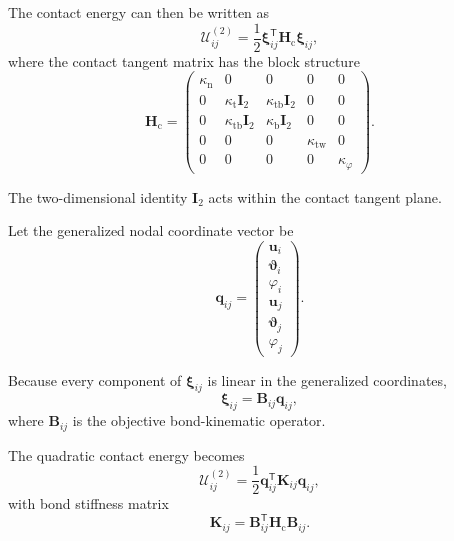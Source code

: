 The contact energy can then be written as
\begin{equation}
    \boxed{ \mathcal{U}_{ij}^{(2)} = \frac{1}{2} \boldsymbol{\xi}_{ij}^{\mathsf{T}} \mathbf{H}_{\mathrm{c}} \boldsymbol{\xi}_{ij} },
\end{equation}
where the contact tangent matrix has the block structure
\begin{equation}
    \boxed{ \mathbf{H}_{\mathrm{c}} =
    \begin{pmatrix}
        \kappa_{\mathrm{n}} & 0 & 0 & 0 & 0 \\
        0 & \kappa_{\mathrm{t}}\mathbf{I}_2 & \kappa_{\mathrm{tb}}\mathbf{I}_2 & 0 & 0 \\
        0 & \kappa_{\mathrm{tb}}\mathbf{I}_2 & \kappa_{\mathrm{b}}\mathbf{I}_2 & 0 & 0 \\
        0 & 0 & 0 & \kappa_{\mathrm{tw}} & 0 \\
        0 & 0 & 0 & 0 & \kappa_{\varphi}
    \end{pmatrix} }.
\end{equation}

The two-dimensional identity $\mathbf{I}_2$ acts within the contact tangent plane.

Let the generalized nodal coordinate vector be
\begin{equation}
    \mathbf{q}_{ij} =
    \begin{pmatrix}
        \mathbf{u}_i \\
        \boldsymbol{\vartheta}_i \\
        \varphi_i \\
        \mathbf{u}_j \\
        \boldsymbol{\vartheta}_j \\
        \varphi_j
    \end{pmatrix}.
\end{equation}

Because every component of $\boldsymbol{\xi}_{ij}$ is linear in the generalized coordinates,
\begin{equation}
    \boldsymbol{\xi}_{ij} = \mathbf{B}_{ij}\mathbf{q}_{ij},
\end{equation}
where $\mathbf{B}_{ij}$ is the objective bond-kinematic operator.

The quadratic contact energy becomes
\begin{equation}
    \mathcal{U}_{ij}^{(2)} = \frac{1}{2} \mathbf{q}_{ij}^{\mathsf{T}} \mathbf{K}_{ij} \mathbf{q}_{ij},
\end{equation}
with bond stiffness matrix
\begin{equation}
    \boxed{ \mathbf{K}_{ij} = \mathbf{B}_{ij}^{\mathsf{T}} \mathbf{H}_{\mathrm{c}} \mathbf{B}_{ij} }.
\end{equation}

